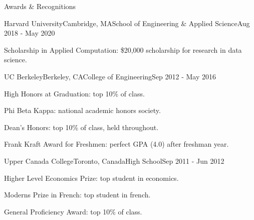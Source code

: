 \documentclass{resume} %
\begin{document}
\begin{rSection}{Awards \& Recognitions}

\begin{rSubsection}{Harvard University}{Cambridge, MA}{School of Engineering \& Applied Science}{Aug 2018 - May 2020}

\item Scholarship in Applied Computation: \$20,000 scholarship for research in data science.

\end{rSubsection}

\begin{rSubsection}{UC Berkeley}{Berkeley, CA}{College of Engineering}{Sep 2012 - May 2016}

\item High Honors at Graduation: top 10\% of class.
\item Phi Beta Kappa: national academic honors society.
\item Dean's Honors: top 10\% of class, held throughout.
\item Frank Kraft Award for Freshmen: perfect GPA (4.0) after freshman year.

\end{rSubsection}

\begin{rSubsection}{Upper Canada College}{Toronto, Canada}{High School}{Sep 2011 - Jun 2012}

\item Higher Level Economics Prize: top student in economics.
\item Moderns Prize in French: top student in french.
\item General Proficiency Award: top 10\% of class.

\end{rSubsection}

\end{rSection}

\end{document}
